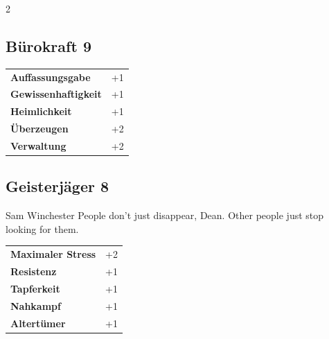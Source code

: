 \begin{multicols}{2}
\begin{tcolorbox}

\end{tcolorbox}

\begin{tcolorbox}
    \subsection*{Bürokraft \hfill \small{9 }}
    \tcblower




\begin{tabular}{@{}ll@{}}
    \textbf{Auffassungsgabe} & +1\\
    \textbf{Gewissenhaftigkeit} & +1\\
    \textbf{Heimlichkeit} & +1\\
    \textbf{Überzeugen} & +2\\
    \textbf{Verwaltung} & +2\\
\end{tabular}


\end{tcolorbox}

\begin{tcolorbox}
    \subsection*{Geisterjäger \hfill \small{8 }}
    \tcblower


\begin{pquote}{Sam Winchester}
People don’t just disappear, Dean. Other people just stop looking for them.
\end{pquote}

\vspace{3mm}

\begin{tabular}{@{}ll@{}}
    \textbf{Maximaler Stress} & +2\\
    \textbf{Resistenz} & +1\\
    \textbf{Tapferkeit} & +1\\
    \textbf{Nahkampf} & +1\\
    \textbf{Altertümer} & +1\\
\end{tabular}


\end{tcolorbox}
\end{multicols}
